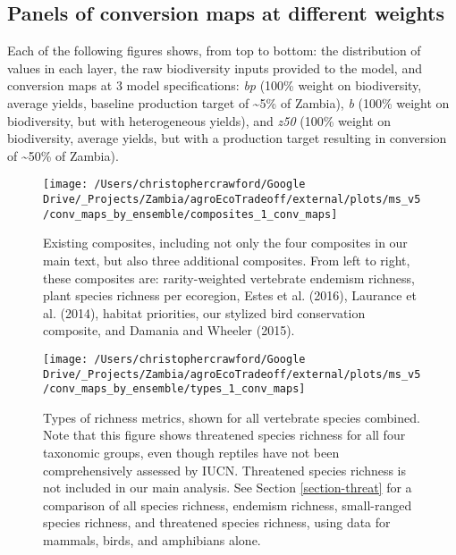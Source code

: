 \documentclass[
]{article}
\begin{document}
\newpage

\hypertarget{panels-of-conversion-maps-at-different-weights}{%
\subsection{Panels of conversion maps at different weights}\label{panels-of-conversion-maps-at-different-weights}}

Each of the following figures shows, from top to bottom: the distribution of values in each layer, the raw biodiversity inputs provided to the model, and conversion maps at 3 model specifications: \emph{bp} (100\% weight on biodiversity, average yields, baseline production target of \textasciitilde5\% of Zambia), \emph{b} (100\% weight on biodiversity, but with heterogeneous yields), and \emph{z50} (100\% weight on biodiversity, average yields, but with a production target resulting in conversion of \textasciitilde50\% of Zambia).

















\begin{figure}
\texttt{[image: /Users/christophercrawford/Google Drive/\_Projects/Zambia/agroEcoTradeoff/external/plots/ms\_v5/conv\_maps\_by\_ensemble/composites\_1\_conv\_maps]} \caption{Existing composites, including not only the four composites in our main text, but also three additional composites. From left to right, these composites are: rarity-weighted vertebrate endemism richness, plant species richness per ecoregion, Estes et al. (2016), Laurance et al. (2014), habitat priorities, our stylized bird conservation composite, and Damania and Wheeler (2015).}\label{fig:conv-maps-comp-1}
\end{figure}

\begin{figure}
\texttt{[image: /Users/christophercrawford/Google Drive/\_Projects/Zambia/agroEcoTradeoff/external/plots/ms\_v5/conv\_maps\_by\_ensemble/types\_1\_conv\_maps]} \caption{Types of richness metrics, shown for all vertebrate species combined. Note that this figure shows threatened species richness for all four taxonomic groups, even though reptiles have not been comprehensively assessed by IUCN. Threatened species richness is not included in our main analysis. See Section \ref{section-threat} for a comparison of all species richness, endemism richness, small-ranged species richness, and threatened species richness, using data for mammals, birds, and amphibians alone.}\label{fig:conv-maps-types-1}
\end{figure}
\end{document}
